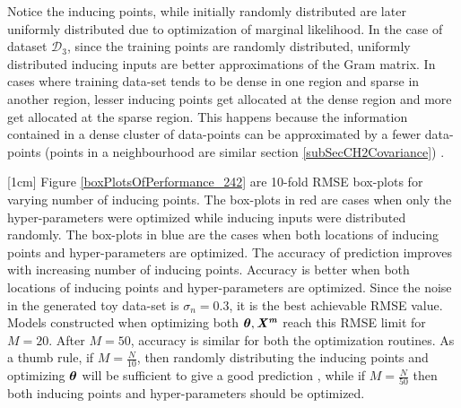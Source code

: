 Notice the inducing points, while initially randomly distributed are later uniformly distributed due to optimization of marginal likelihood. In the case of dataset $\mathcal{D}_3$, since the training points are randomly distributed, uniformly distributed inducing inputs are better approximations of the Gram matrix. In cases where training data-set tends to be dense in one region and sparse in another region, lesser inducing points get allocated at the dense region and more get allocated at the sparse region. This happens because the information contained in a dense cluster of data-points can be approximated by a fewer data-points (points in a neighbourhood are similar section \ref{subSecCH2Covariance}) \cite{Snelson06sparsegaussian}.

[1cm]
Figure \ref{boxPlotsOfPerformance_242} are 10-fold RMSE box-plots for varying number of inducing points. The box-plots in red are cases when only the hyper-parameters were optimized while inducing inputs were distributed randomly. The box-plots in blue are the cases when both locations of inducing points and hyper-parameters are optimized. The accuracy of prediction improves with increasing number of inducing points. Accuracy is better when both locations of inducing points and hyper-parameters are optimized. Since the noise in the generated toy data-set is $\sigma_{n}=0.3$, it is the best achievable RMSE value. Models constructed when optimizing both $\boldsymbol{\theta}, \bm{\mathit{X^{m}}}$ reach this RMSE limit for $M = 20$. After $M=50$, accuracy is similar for both the optimization routines. As a thumb rule, if $M = \frac{N}{10}$, then randomly distributing the inducing points and optimizing $\boldsymbol{\theta}$ will be sufficient to give a good prediction \cite{cao2013efficient}, while if $M = \frac{N}{50}$ then both inducing points and hyper-parameters should be optimized. 

